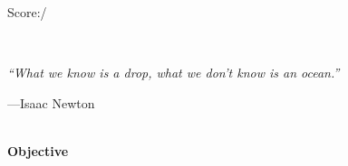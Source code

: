 

\addpoints



\vspace*{-0.2in} %
\noindent
{} 
\makebox[0.25\textwidth][l]{\hrulefill}\\[0.25cm]
\hfill 
{}\hfill
\makebox[0.25\textwidth][l]{ \texttt{\underline\coursename}}\hfill \\[0.25cm]
\makebox[0.65\textwidth]{}\hfill
\makebox[0.25\textwidth][l]{\enspace\texttt{\underline{\term\ \courseyear}}}\hfill 
\hfill{Score:\underline{\hspace{2cm}}/\numpoints}
\vspace{0.5in} %

\begin{centering}
\noindent\textbf{\Large \worksheetname} \\[0.1in]
\end{centering}
\vspace{0.1in}
\epigraph{\itshape``What we know is a drop, what we don't know is an ocean.''}{---Isaac Newton}
\qsp
\textbf{\\\Large Objective\\}



